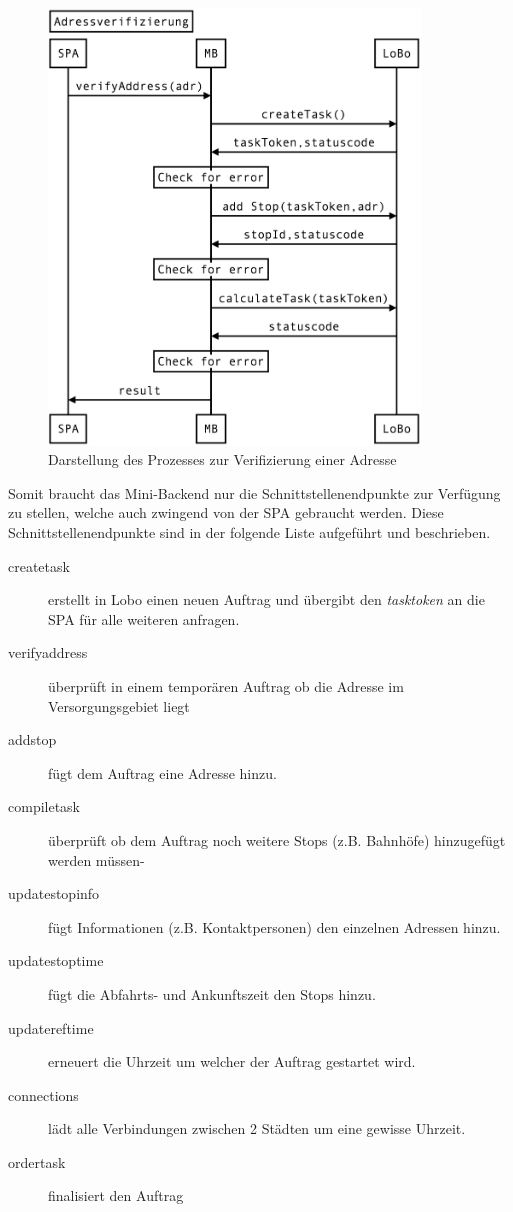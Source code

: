 \begin{figure}[ht]
	\centering
  \includegraphics[width=0.88\textwidth]{images/addressverify.png}
	\caption{Darstellung des Prozesses zur Verifizierung einer Adresse}
	\label{fig:addressverify}
\end{figure}

Somit braucht das Mini-Backend nur die Schnittstellenendpunkte zur Verfügung zu stellen, welche auch zwingend von der SPA gebraucht werden. Diese Schnittstellenendpunkte sind in der folgende Liste aufgeführt und beschrieben.

\begin{description}
	\item[createtask] erstellt in Lobo einen neuen Auftrag und übergibt den \textit{tasktoken} an die SPA für alle weiteren anfragen.
	\item[verifyaddress] überprüft in einem temporären Auftrag ob die Adresse im Versorgungsgebiet liegt
	\item[addstop] fügt dem Auftrag eine Adresse hinzu.
	\item[compiletask] überprüft ob dem Auftrag noch weitere Stops (z.B. Bahnhöfe) hinzugefügt werden müssen-
	\item[updatestopinfo] fügt Informationen (z.B. Kontaktpersonen) den einzelnen Adressen hinzu.
	\item[updatestoptime] fügt die Abfahrts- und Ankunftszeit den Stops hinzu.
	\item[updatereftime] erneuert die Uhrzeit um welcher der Auftrag gestartet wird.
	\item[connections] lädt alle Verbindungen zwischen 2 Städten um eine gewisse Uhrzeit.
	\item[ordertask] finalisiert den Auftrag
\end{description}


